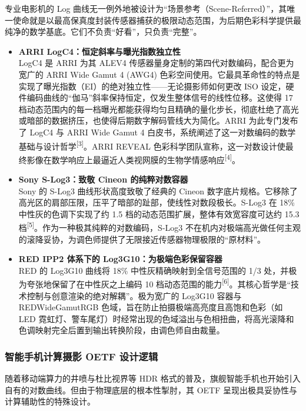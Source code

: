 \documentclass[12pt, a4paper]{ctexart}
\newcommand{\scite}[1]{\textsuperscript{[#1]}}
\begin{document}
专业电影机的 Log 曲线无一例外地被设计为“场景参考（Scene-Referred）”，其唯一使命就是以最高保真度封装传感器捕获的极限动态范围，为后期色彩科学提供最纯净的数学基底。它们不负责“好看”，只负责“完整”。

\begin{itemize}
    \item \textbf{ARRI LogC4：恒定斜率与曝光指数独立性} \\
    LogC4 是 ARRI 为其 ALEV4 传感器量身定制的第四代对数编码，配合更为宽广的 ARRI Wide Gamut 4 (AWG4) 色彩空间使用。它最具革命性的特点是实现了曝光指数（EI）的绝对独立性——无论摄影师如何更改 ISO 设定，硬件编码曲线的“伽马”斜率保持恒定，仅发生整体信号的线性位移。这使得 17 档动态范围内的每一档曝光都能获得均匀且精确的量化步长，彻底杜绝了高光或暗部的数据挤压，也使得后期数字解码管线大为简化。ARRI 为此专门发布了 LogC4 与 ARRI Wide Gamut 4 白皮书，系统阐述了这一对数编码的数学基础与设计哲学\scite{3}。ARRI REVEAL 色彩科学团队宣称，这一对数设计使最终影像在数学响应上最逼近人类视网膜的生物学情感响应\scite{4}。
    \item \textbf{Sony S-Log3：致敬 Cineon 的纯粹对数容器} \\
    Sony 的 S-Log3 曲线形状高度致敬了经典的 Cineon 数字底片规格。它移除了高光区的肩部压限，压平了暗部的趾部，使线性对数段极长。S-Log3 在 18\% 中性灰的色调下实现了约 1.5 档的动态范围扩展，整体有效宽容度可达约 15.3 档\scite{5}。作为一种极其纯粹的对数编码，S-Log3 不在机内对极端高光做任何主观的滚降妥协，为调色师提供了无限接近传感器物理极限的“原材料”。
    \item \textbf{RED IPP2 体系下的 Log3G10：为极端色彩保留容器} \\
    RED 的 Log3G10 曲线将 18\% 中性灰精确映射到全信号范围的 1/3 处，并极为夸张地保留了在中性灰之上编码 10 档动态范围的能力\scite{6}。其核心哲学是“技术控制与创意渲染的绝对解耦”。极为宽广的 Log3G10 容器与 REDWideGamutRGB 色域，旨在防止拍摄极端高亮度且高饱和色彩（如 LED 霓虹灯、警车尾灯）时经常出现的色域溢出与色相扭曲，将高光滚降和色调映射完全后置到输出转换阶段，由调色师自由裁量。
\end{itemize}

\subsubsection{智能手机计算摄影 OETF 设计逻辑}

随着移动端算力的井喷与杜比视界等 HDR 格式的普及，旗舰智能手机也开始引入自有的对数曲线。但由于物理底层的根本性掣肘，其 OETF 呈现出极具妥协性与计算辅助性的特殊设计。
\end{document}
